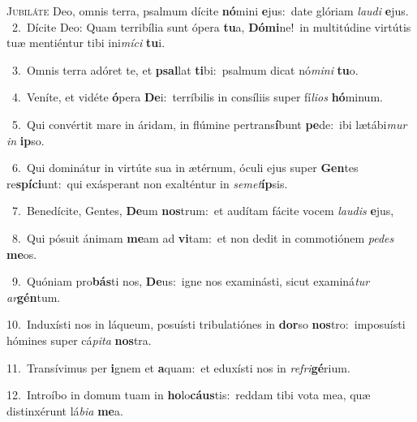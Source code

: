 \lettrine{\initial\textcolor{\initialcolor}{J}}{ubiláte} Deo, omnis terra, psalmum dícite \textbf{nó}\-mini \textbf{e}\-jus:~\star date glóriam \textit{lau}\-\textit{di} \textbf{e}\-jus.\\
{\numbfont\textcolor{\numbcolor}{~2.}}~Dícite Deo: Quam terribília sunt ópera \textbf{tu}\-a, \textbf{Dó}\-\textbf{mi}ne!~\star in multitúdine virtútis tuæ mentiéntur tibi ini\-\textit{mí}\-\textit{ci} \textbf{tu}\-i.\par
{\numbfont\textcolor{\numbcolor}{~3.}}~Omnis terra adóret te, et \textbf{psal}\-lat \textbf{ti}\-bi:~\star psalmum dicat nó\-\textit{mi}\-\textit{ni} \textbf{tu}\-o.\par
{\numbfont\textcolor{\numbcolor}{~4.}}~Veníte, et vidéte \textbf{ó}\-pera \textbf{De}\-i:~\star terríbilis in consíliis super fí\-\textit{li}\-\textit{os} \textbf{hó}\-minum.\par
{\numbfont\textcolor{\numbcolor}{~5.}}~Qui convértit mare in áridam, in flúmine pertrans\-\textbf{í}\-bunt \textbf{pe}\-de:~\star ibi lætábi\textit{mur} \textit{in} \textbf{ip}\-so.\par
{\numbfont\textcolor{\numbcolor}{~6.}}~Qui dominátur in virtúte sua in ætérnum, óculi ejus super \textbf{Gen}\-tes re\-\textbf{spí}\-\textbf{ci}unt:~\star qui exásperant non exalténtur in \textit{se}\-\textit{met}\textbf{íp}sis.\par
{\numbfont\textcolor{\numbcolor}{~7.}}~Benedícite, Gentes, \textbf{De}\-um \textbf{nos}\-trum:~\star et audítam fácite vocem \textit{lau}\-\textit{dis} \textbf{e}\-jus,\par
{\numbfont\textcolor{\numbcolor}{~8.}}~Qui pósuit ánimam \textbf{me}\-am ad \textbf{vi}\-tam:~\star et non dedit in commotiónem \textit{pe}\-\textit{des} \textbf{me}\-os.\par
{\numbfont\textcolor{\numbcolor}{~9.}}~Quóniam pro\-\textbf{bás}\-ti nos, \textbf{De}\-us:~\star igne nos examinásti, sicut examiná\textit{tur} \textit{ar}\-\textbf{gén}tum.\par
{\numbfont\textcolor{\numbcolor}{10.}}~Induxísti nos in láqueum, posuísti tribulatiónes in \textbf{dor}\-so \textbf{nos}\-tro:~\star imposuísti hómines super cá\-\textit{pi}\-\textit{ta} \textbf{nos}\-tra.\par
{\numbfont\textcolor{\numbcolor}{11.}}~Transívimus per \textbf{i}\-gnem et \textbf{a}\-quam:~\star et eduxísti nos in \textit{re}\-\textit{fri}\textbf{gé}rium.\par
{\numbfont\textcolor{\numbcolor}{12.}}~Introíbo in domum tuam in \textbf{ho}\-lo\-\textbf{cáus}\-tis:~\star reddam tibi vota mea, quæ distinxérunt lá\-\textit{bi}\-\textit{a} \textbf{me}\-a.\par
